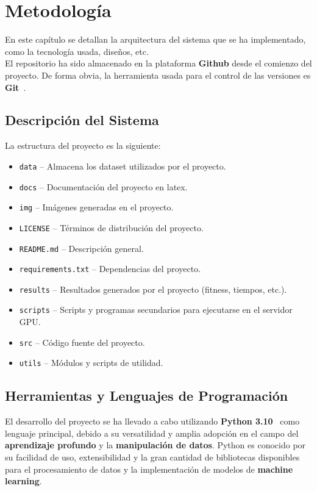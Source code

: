 \chapter{Metodología}\label{ch:Metodologia}
En este capítulo se detallan la arquitectura del sistema que se ha implementado, como la tecnología usada, diseños, etc.
\\[6pt]

El repositorio ha sido almacenado en la plataforma \textbf{Github} desde el comienzo del proyecto.
De forma obvia, la herramienta usada para el control de las versiones es \textbf{Git}~\cite{}. \\[6pt]

\section{Descripción del Sistema}\label{sec:descripcion_del_sistema}
La estructura del proyecto es la siguiente:
\begin{itemize}
    \item \texttt{data} -- Almacena los dataset utilizados por el proyecto.
    \item \texttt{docs} -- Documentación del proyecto en latex.
    \item \texttt{img} -- Imágenes generadas en el proyecto.
    \item \texttt{LICENSE} -- Términos de distribución del proyecto.
    \item \texttt{README.md} -- Descripción general.
    \item \texttt{requirements.txt} -- Dependencias del proyecto.
    \item \texttt{results} -- Resultados generados por el proyecto (fitness, tiempos, etc.).
    \item \texttt{scripts} -- Scripts y programas secundarios para ejecutarse en el servidor GPU\@.
    \item \texttt{src} -- Código fuente del proyecto.
    \item \texttt{utils} -- Módulos y scripts de utilidad.
\end{itemize}

\section{Herramientas y Lenguajes de Programación}\label{sec:herramientas_y_lenguajes_de_programacion}
El desarrollo del proyecto se ha llevado a cabo utilizando \textbf{Python 3.10}~\cite{} como lenguaje principal,
debido a su versatilidad y amplia adopción en el campo del \textbf{aprendizaje profundo} y la
\textbf{manipulación de datos}.
Python es conocido por su facilidad de uso, extensibilidad y la gran cantidad de bibliotecas disponibles para el
procesamiento de datos y la implementación de modelos de \textbf{machine learning}. \\[6pt]

